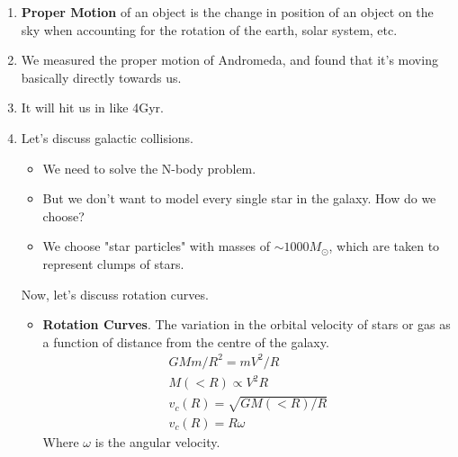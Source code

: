 \documentclass[a4paper]{article}
\begin{document}
\begin{enumerate}
  \item {\bf Proper Motion} of an object is the change in position of an object on the sky when accounting for the rotation of the earth, solar system, etc.
  \item We measured the proper motion of Andromeda, and found that it's moving basically directly towards us.
  \item It will hit us in like 4Gyr.
  \item Let's discuss galactic collisions.
    \begin{itemize}
      \item We need to solve the N-body problem.
      \item But we don't want to model every single star in the galaxy. How do we choose?
      \item We choose "star particles" with masses of $\sim 1000M_{\odot}$, which are taken to represent clumps of stars.
    \end{itemize}
Now, let's discuss rotation curves.
\begin{itemize}
  \item {\bf Rotation Curves}. The variation in the orbital velocity of stars or gas as a function of distance from the centre of the galaxy.
    \begin{gather}
       GMm/R^{2}=mV^{2}/R \\
       M(<R)\propto V^{2}R \\
       v_{c}(R) = \sqrt{GM(<R)/R} \\
    v_{c}(R)=R\omega
    \end{gather}
    Where $\omega$ is the angular velocity.


\end{itemize}
\end{enumerate}
\end{document}
